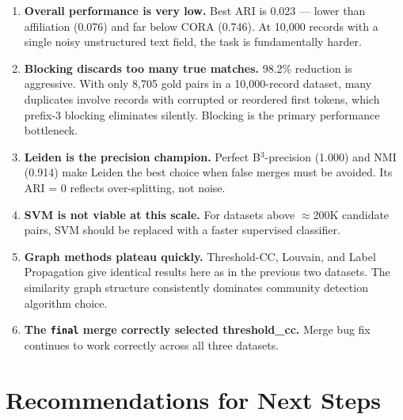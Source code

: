 \documentclass[11pt, a4paper]{article}
\begin{document}
\begin{enumerate}[leftmargin=*, label=\arabic*.]
  \item \textbf{Overall performance is very low.} Best ARI is 0.023 --- lower than
        affiliation (0.076) and far below CORA (0.746). At 10,000 records with a single
        noisy unstructured text field, the task is fundamentally harder.

  \item \textbf{Blocking discards too many true matches.} 98.2\% reduction is
        aggressive. With only 8,705 gold pairs in a 10,000-record dataset, many duplicates
        involve records with corrupted or reordered first tokens, which prefix-3 blocking
        eliminates silently. Blocking is the primary performance bottleneck.

  \item \textbf{Leiden is the precision champion.} Perfect B$^3$-precision (1.000) and
        NMI (0.914) make Leiden the best choice when false merges must be avoided.
        Its ARI = 0 reflects over-splitting, not noise.

  \item \textbf{SVM is not viable at this scale.} For datasets above $\approx$200K
        candidate pairs, SVM should be replaced with a faster supervised classifier.

  \item \textbf{Graph methods plateau quickly.} Threshold-CC, Louvain, and Label
        Propagation give identical results here as in the previous two datasets. The
        similarity graph structure consistently dominates community detection algorithm
        choice.

  \item \textbf{The \texttt{final} merge correctly selected threshold\_cc.} Merge bug
        fix continues to work correctly across all three datasets.
\end{enumerate}

\section{Recommendations for Next Steps}
\end{document}
